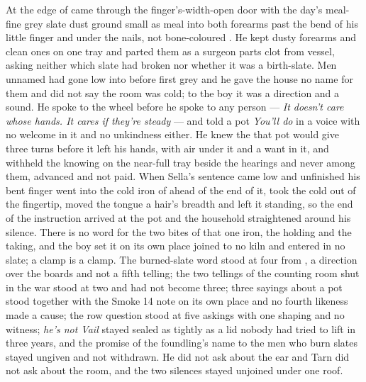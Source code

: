At the edge of   came through the finger's-width-open door with the day's meal-fine grey slate dust ground small as meal into both forearms past the bend of his little finger and under the nails, not bone-coloured . He kept dusty forearms and clean ones on one tray and parted them as a surgeon parts clot from vessel, asking neither which slate had broken nor whether it was a birth-slate. Men unnamed had gone low into  before first grey and he gave the house no name for them and did not say the room was cold; to the boy it was a direction and a sound. He spoke to the wheel before he spoke to any person --- \emph{It doesn't care whose hands. It cares if they're steady} --- and told a pot \emph{You'll do} in a voice with no welcome in it and no unkindness either. He knew the  that pot would give three turns before it left his hands, with air under it and a want in it, and withheld the knowing on the near-full tray beside the hearings and never among them, advanced and not paid. When Sella's sentence came low and unfinished his bent finger went into the cold iron of  ahead of the end of it, took the cold out of the fingertip, moved the tongue a hair's breadth and left it standing, so the end of the instruction arrived at the pot and the household straightened around his silence. There is no  word for the two bites of that one iron, the holding and the taking, and the boy set it on its own place joined to no kiln and entered in no slate; a clamp is a clamp. The burned-slate word stood at four from , a direction over the boards and not a fifth telling; the two tellings of the counting room shut in the war stood at two and had not become three; three sayings about a pot stood together with the Smoke 14 note on its own place and no fourth likeness made a cause; the row question stood at five askings with one shaping and no witness; \emph{he's not Vail} stayed sealed as tightly as a lid nobody had tried to lift in three years, and the promise of the foundling's name to the men who burn slates stayed ungiven and not withdrawn. He did not ask about the ear and Tarn did not ask about the room, and the two silences stayed unjoined under one roof.

